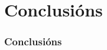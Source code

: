 \documentclass{beamer}
\begin{document}
\section{Conclusións}
%
\begin{frame}
\frametitle{Conclusións}
%
%
%
\end{frame}
%
%
%
\end{document}

